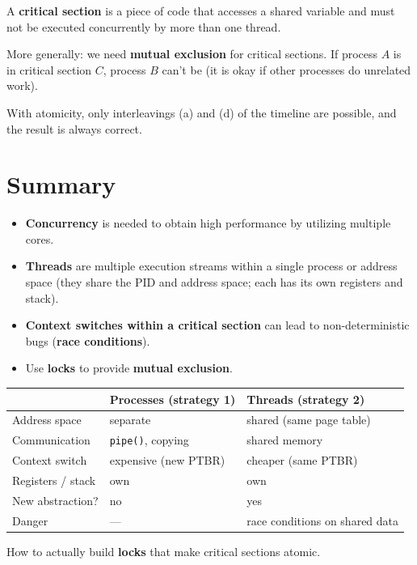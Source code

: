\documentclass[11pt,a4paper]{article}
\begin{document}
\begin{defbox}
A \textbf{critical section} is a piece of code that accesses a shared
variable and must not be executed concurrently by more than one thread.

More generally: we need \textbf{mutual exclusion} for critical sections.
If process \(A\) is in critical section \(C\), process \(B\) can't be
(it is okay if other processes do unrelated work).
\end{defbox}

With atomicity, only interleavings (a) and (d) of the timeline are
possible, and the result is always correct.

\section{Summary}

\begin{keybox}[Conclusions]
\begin{itemize}
  \item \textbf{Concurrency} is needed to obtain high performance by
        utilizing multiple cores.
  \item \textbf{Threads} are multiple execution streams within a single
        process or address space (they share the PID and address space;
        each has its own registers and stack).
  \item \textbf{Context switches within a critical section} can lead to
        non-deterministic bugs (\textbf{race conditions}).
  \item Use \textbf{locks} to provide \textbf{mutual exclusion}.
\end{itemize}
\end{keybox}

\begin{center}
\renewcommand{\arraystretch}{1.18}
\begin{tabular}{@{}lll@{}}
  \toprule
  & \textbf{Processes (strategy 1)} & \textbf{Threads (strategy 2)} \\
  \midrule
  Address space        & separate             & shared (same page table) \\
  Communication        & \texttt{pipe()}, copying & shared memory \\
  Context switch       & expensive (new PTBR) & cheaper (same PTBR) \\
  Registers / stack    & own                  & own \\
  New abstraction?     & no                   & yes \\
  Danger               & ---                  & race conditions on shared data \\
  \bottomrule
\end{tabular}
\end{center}

\begin{warnbox}[Next]
How to actually build \textbf{locks} that make critical sections atomic.
\end{warnbox}
\end{document}
